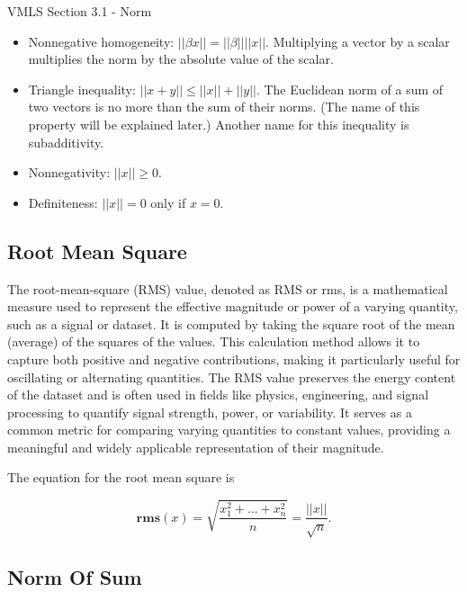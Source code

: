 \begin{notes}{VMLS Section 3.1 - Norm}
    \begin{itemize}
        \item Nonnegative homogeneity: $|| \beta x || = ||\beta|| || x ||$. Multiplying a vector by a scalar multiplies the norm by the absolute value of the scalar.
        \item Triangle inequality: $|| x + y || \leq || x || + || y ||$. The Euclidean norm of a sum of two vectors is no more than the sum of their norms. (The name of this property will be explained later.) 
        Another name for this inequality is subadditivity.
        \item Nonnegativity: $|| x || \geq 0$.
        \item Definiteness: $|| x || = 0$ only if $x = 0$.
    \end{itemize}

    \subsection*{Root Mean Square}

    The root-mean-square (RMS) value, denoted as RMS or rms, is a mathematical measure used to represent the effective magnitude or power of a varying quantity, such as a signal or dataset. It is computed by 
    taking the square root of the mean (average) of the squares of the values. This calculation method allows it to capture both positive and negative contributions, making it particularly useful for oscillating 
    or alternating quantities. The RMS value preserves the energy content of the dataset and is often used in fields like physics, engineering, and signal processing to quantify signal strength, power, or 
    variability. It serves as a common metric for comparing varying quantities to constant values, providing a meaningful and widely applicable representation of their magnitude.

    \begin{Highlight}
        The equation for the root mean square is

        \begin{equation*}
            \mathbf{rms}(x) = \sqrt{\frac{x^{2}_{1} + \dots + x^{2}_{n}}{n}} = \frac{||x||}{\sqrt{n}}.
        \end{equation*}
    \end{Highlight}

    \subsection*{Norm Of Sum}


\end{notes}
